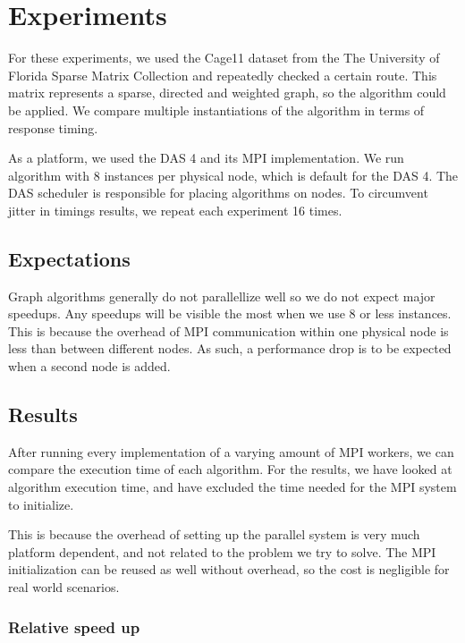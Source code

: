 \chapter{Experiments}

For these experiments, we used the Cage11 dataset from the The University of Florida Sparse Matrix Collection and repeatedly checked a certain route.%
This matrix represents a sparse, directed and weighted graph, so the algorithm could be applied. We compare multiple instantiations of the algorithm in terms of response timing.

As a platform, we used the DAS 4 and its MPI implementation. We run algorithm with 8 instances per physical node, which is default for the DAS 4. %
The DAS scheduler is responsible for placing algorithms on nodes. To circumvent jitter in timings results, we repeat each experiment 16 times.

\section{Expectations}

Graph algorithms generally do not parallellize well %
so we do not expect major speedups. Any speedups will be visible the most when we use 8 or less instances. This is because the overhead of MPI communication within one physical node is less than between different nodes. As such, a performance drop is to be expected when a second node is added.

\section{Results}

After running every implementation of a varying amount of MPI workers, we can compare the execution time of each algorithm. For the results, we have looked at algorithm execution time, and have excluded the time needed for the MPI system to initialize.

This is because the overhead of setting up the parallel system is very much platform dependent, and not related to the problem we try to solve. The MPI initialization can be reused as well without overhead, so the cost is negligible for real world scenarios.

\subsection{Relative speed up}

